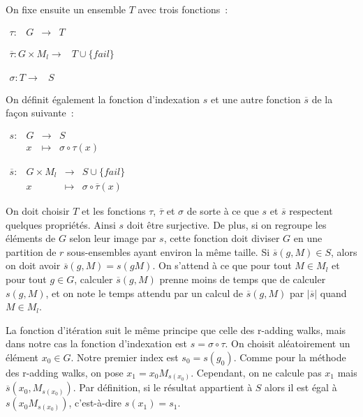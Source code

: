       On fixe ensuite un ensemble $T$ avec trois fonctions~:

      $\begin{array}{lrcl}
        \tau : & G & \longrightarrow & T
      \end{array}$

      $\begin{array}{lrcl}
        \overline{\tau} : G \times M_l \longrightarrow & T \cup \{fail\}
      \end{array}$

      $\begin{array}{lrcl}
        \sigma : T \longrightarrow & S
      \end{array}$

      On définit également la fonction d'indexation $s$ et une autre fonction $\overline{s}$ de la façon suivante~:

      $\begin{array}{lrcl}
        s : & G & \longrightarrow & S \\
            & x & \longmapsto & \sigma \circ \tau (x)
      \end{array}$

      $\begin{array}{lrcl}
        \overline{s} : & G \times M_l & \longrightarrow & S \cup \{fail\} \\
                       & x & \longmapsto & \sigma \circ \overline{\tau} (x)
      \end{array}$

      On doit choisir $T$ et les fonctions $\tau$, $\overline{\tau}$ et $\sigma$ de sorte à ce que $s$ et $\overline{s}$ respectent quelques propriétés. Ainsi $s$ doit être surjective. De plus, si on regroupe les éléments de $G$ selon leur image par $s$, cette fonction doit diviser $G$ en une partition de $r$ sous-ensembles ayant environ la même taille. Si $\overline{s}(g,M) \in S$, alors on doit avoir $\overline{s}(g,M) = s(g M)$. On s'attend à ce que pour tout $M \in M_l$ et pour tout $g \in G$, calculer $\overline{s}(g,M)$ prenne moins de temps que de calculer $s(g,M)$, et on note le temps attendu par un calcul de $\overline{s}(g,M)$ par $|\overline{s}|$ quand $M \in M_l$.

      La fonction d'itération suit le même principe que celle des r-adding walks, mais dans notre cas la fonction d'indexation est $s = \sigma \circ \tau$. On choisit aléatoirement un élément $x_0 \in G$. Notre premier index est $s_0 = s(g_0)$. Comme pour la méthode des r-adding walks, on pose $x_1 = x_0 M_{s(x_0)}$. Cependant, on ne calcule pas $x_1$ mais $\overline{s}(x_0,M_{s(x_0)})$. Par définition, si le résultat appartient à $S$ alors il est égal à $s(x_0 M_{s(x_0)})$, c'est-à-dire $s(x_1) = s_1$.


